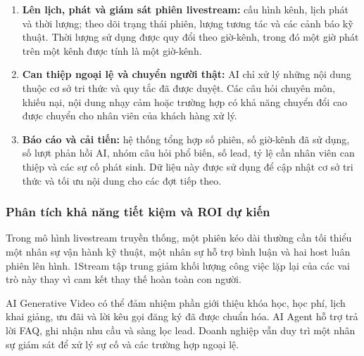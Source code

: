 \begin{enumerate}
    \item \textbf{Lên lịch, phát và giám sát phiên livestream:} cấu hình kênh,
    lịch phát và thời lượng; theo dõi trạng thái phiên, lượng tương tác và các
    cảnh báo kỹ thuật. Thời lượng sử dụng được quy đổi theo giờ-kênh, trong đó
    một giờ phát trên một kênh được tính là một giờ-kênh.

    \item \textbf{Can thiệp ngoại lệ và chuyển người thật:} AI chỉ xử lý những
    nội dung thuộc cơ sở tri thức và quy tắc đã được duyệt. Các câu hỏi chuyên
    môn, khiếu nại, nội dung nhạy cảm hoặc trường hợp có khả năng chuyển đổi
    cao được chuyển cho nhân viên của khách hàng xử lý.

    \item \textbf{Báo cáo và cải tiến:} hệ thống tổng hợp số phiên, số giờ-kênh
    đã sử dụng, số lượt phản hồi AI, nhóm câu hỏi phổ biến, số lead, tỷ lệ cần
    nhân viên can thiệp và các sự cố phát sinh. Dữ liệu này được sử dụng để cập
    nhật cơ sở tri thức và tối ưu nội dung cho các đợt tiếp theo.
\end{enumerate}


\subsubsection*{Phân tích khả năng tiết kiệm và ROI dự kiến}

Trong mô hình livestream truyền thống, một phiên kéo dài thường cần tối thiểu
một nhân sự vận hành kỹ thuật, một nhân sự hỗ trợ bình luận và hai host luân
phiên lên hình. 1Stream tập trung giảm khối lượng công việc lặp lại của các vai
trò này thay vì cam kết thay thế hoàn toàn con người.

AI Generative Video có thể đảm nhiệm phần giới thiệu khóa học, học phí, lịch
khai giảng, ưu đãi và lời kêu gọi đăng ký đã được chuẩn hóa. AI Agent hỗ trợ
trả lời FAQ, ghi nhận nhu cầu và sàng lọc lead. Doanh nghiệp vẫn duy trì một
nhân sự giám sát để xử lý sự cố và các trường hợp ngoại lệ.

